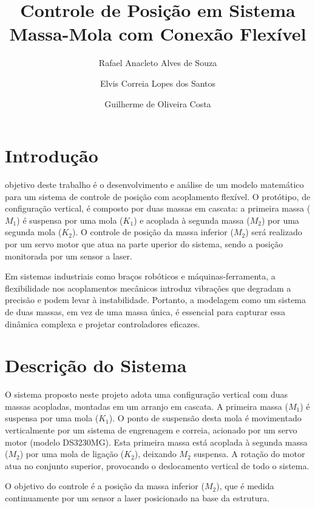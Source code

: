 \documentclass[9pt,a4paper,twocolumn,twoside]{tau-class/tau}
\title{Controle de Posição em Sistema Massa-Mola com Conexão Flexível}
\author[a,1]{Rafael Anacleto Alves de Souza}
\author[a,2]{Elvis Correia Lopes dos Santos}
\author[a,3]{Guilherme de Oliveira Costa}
\affil[a]{Instituto de Computação, Universidade Federal de Alagoas – Campus A.C. Simões\\
\textsuperscript{1}\texttt{raas@ic.ufal.br}, 
\textsuperscript{2}\texttt{ecls@ic.ufal.br}, 
\textsuperscript{3}\texttt{goc@ic.ufal.br}}
\begin{document}
		
    \maketitle 
    \thispagestyle{firststyle} 
    \tauabstract
    

\section{Introdução}

objetivo deste trabalho é o desenvolvimento e análise de um modelo matemático para um sistema de controle de posição com acoplamento flexível. O protótipo, de configuração vertical, é composto por duas massas em cascata: a primeira massa ($M_1$) é suspensa por uma mola ($K_1$) e acoplada à segunda massa ($M_2$) por uma segunda mola ($K_2$). O controle de posição da massa inferior ($M_2$) será realizado por um servo motor que atua na parte uperior do sistema, sendo a posição monitorada por um sensor a laser.

Em sistemas industriais como braços robóticos e máquinas-ferramenta, a flexibilidade nos acoplamentos mecânicos introduz vibrações que degradam a precisão e podem levar à instabilidade. Portanto, a modelagem como um sistema de duas massas, em vez de uma massa única, é essencial para capturar essa dinâmica complexa e projetar controladores eficazes.

\section{Descrição do Sistema}

O sistema proposto neste projeto adota uma configuração vertical com duas massas acopladas, montadas em um arranjo em cascata. A primeira massa ($M_1$) é suspensa por uma mola ($K_1$). O ponto de suspensão desta mola é movimentado verticalmente por um sistema de engrenagem e correia, acionado por um servo motor (modelo DS3230MG). Esta primeira massa está acoplada à segunda massa ($M_2$) por uma mola de ligação ($K_2$), deixando $M_2$ suspensa. A rotação do motor atua no conjunto superior, provocando o deslocamento vertical de todo o sistema.

O objetivo do controle é a posição da massa inferior ($M_2$), que é medida continuamente por um sensor a laser posicionado na base da estrutura. 
\end{document}
